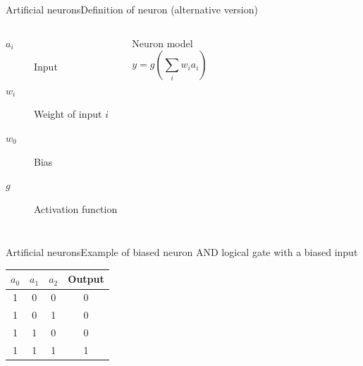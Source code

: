 \documentclass[10pt,compress]{beamer} %
\begin{document}
\begin{frame}{Artificial neurons}{Definition of neuron (alternative version)}
    

	\bigskip
    \begin{columns}
		\begin{description}
		\item[$a_i$] Input
		\item[$w_{i}$] Weight of input $i$
		\item[$w_0$] Bias
		\item[$g$] Activation function
		\end{description}

	   \begin{block}{Neuron model}
	   \vspace{-0.5cm}
	   \begin{equation*}
	   y=g\left( \sum_{i} w_{i} a_i \right)
	   \end{equation*}
	   \end{block}

    \end{columns}
\end{frame}

\begin{frame}{Artificial neurons}{Example of biased neuron}
	AND logical gate with a biased input

	\centering 

	\bigskip

	\centering \begin{tabular}{ccc|c}\hline
	$a_0$ & $a_1$ & $a_2$& Output\\\hline
	1    & 0     & 0     & 0\\
	1    & 0     & 1     & 0\\
	1    & 1     & 0     & 0\\
	1    & 1     & 1     & 1\\\hline
	\end{tabular}
\end{frame}
\end{document}

